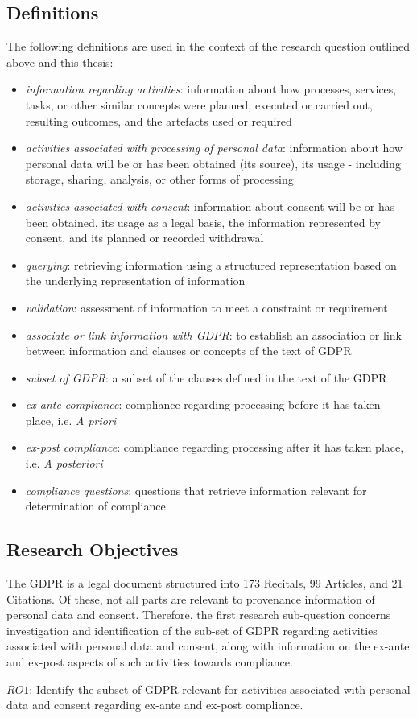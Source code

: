 \subsection{Definitions}
The following definitions are used in the context of the research question outlined above and this thesis:
\begin{itemize}
    \item \textit{information regarding activities}: information about how processes, services, tasks, or other similar concepts were planned, executed or carried out, resulting outcomes, and the artefacts used or required
    \item \textit{activities associated with processing of personal data}: information about how personal data will be or has been obtained (its source), its usage - including storage, sharing, analysis, or other forms of processing 
    \item \textit{activities associated with consent}: information about consent will be or has been obtained, its usage as a legal basis, the information represented by consent, and its planned or recorded withdrawal
    \item \textit{querying}: retrieving information using a structured representation based on the underlying representation of information
    \item \textit{validation}: assessment of information to meet a constraint or requirement
    \item \textit{associate or link information with GDPR}: to establish an association or link between information and clauses or concepts of the text of GDPR
    \item \textit{subset of GDPR}: a subset of the clauses defined in the text of the GDPR
    \item \textit{ex-ante compliance}: compliance regarding processing before it has taken place, i.e. \textit{A priori}
    \item \textit{ex-post compliance}: compliance regarding processing after it has taken place, i.e. \textit{A posteriori}
    \item \textit{compliance questions}: questions that retrieve information relevant for determination of compliance
\end{itemize}

\subsection{Research Objectives}
The GDPR is a legal document structured into 173 Recitals, 99 Articles, and 21 Citations. Of these, not all parts are relevant to provenance information of personal data and consent. Therefore, the first research sub-question concerns investigation and identification of the sub-set of GDPR regarding activities associated with personal data and consent, along with information on the ex-ante and ex-post aspects of such activities towards compliance.
\begin{framed}
$RO1$: Identify the subset of GDPR relevant for activities associated with personal data and consent regarding ex-ante and ex-post compliance.
\end{framed}

